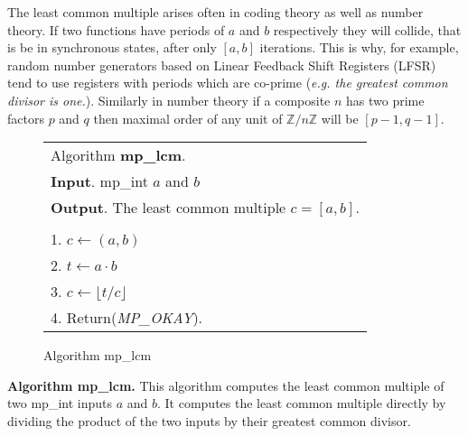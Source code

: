 \documentclass[b5paper]{book}
\def\Z{{\mathbb Z}}
\begin{document}
The least common multiple arises often in coding theory as well as number theory.  If two functions have periods of $a$ and $b$ respectively they will
collide, that is be in synchronous states, after only $[ a, b ]$ iterations.  This is why, for example, random number generators based on 
Linear Feedback Shift Registers (LFSR) tend to use registers with periods which are co-prime (\textit{e.g. the greatest common divisor is one.}).  
Similarly in number theory if a composite $n$ has two prime factors $p$ and $q$ then maximal order of any unit of $\Z/n\Z$ will be $[ p - 1, q - 1] $.

\begin{figure}[!here]
\begin{small}
\begin{center}
\begin{tabular}{l}
\hline Algorithm \textbf{mp\_lcm}. \\
\textbf{Input}.   mp\_int $a$ and $b$ \\
\textbf{Output}.  The least common multiple $c = [a, b]$.  \\
\hline \\
1.  $c \leftarrow (a, b)$ \\
2.  $t \leftarrow a \cdot b$ \\
3.  $c \leftarrow \lfloor t / c \rfloor$ \\
4.  Return(\textit{MP\_OKAY}). \\
\hline
\end{tabular}
\end{center}
\end{small}
\caption{Algorithm mp\_lcm}
\end{figure}
\textbf{Algorithm mp\_lcm.}
This algorithm computes the least common multiple of two mp\_int inputs $a$ and $b$.  It computes the least common multiple directly by
dividing the product of the two inputs by their greatest common divisor.
\end{document}
